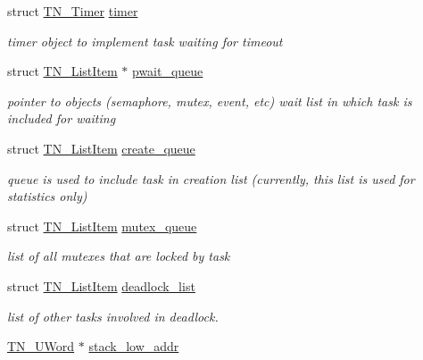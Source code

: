 \begin{DoxyCompactItemize}
struct \hyperlink{structTN__Timer}{T\+N\+\_\+\+Timer} \hyperlink{structTN__Task_ac394d7ba177bab077969e9d96cddd8fb}{timer}
\begin{DoxyCompactList}\small\item\em timer object to implement task waiting for timeout \end{DoxyCompactList}\item 
\mbox{\label{structTN__Task_a971ab5689af53bed2548c62f3bcabdc5}} 
struct \hyperlink{structTN__ListItem}{T\+N\+\_\+\+List\+Item} $\ast$ \hyperlink{structTN__Task_a971ab5689af53bed2548c62f3bcabdc5}{pwait\+\_\+queue}
\begin{DoxyCompactList}\small\item\em pointer to object\textquotesingle{}s (semaphore, mutex, event, etc) wait list in which task is included for waiting \end{DoxyCompactList}\item 
\mbox{\label{structTN__Task_aedb23df723d259530f10a122fec42334}} 
struct \hyperlink{structTN__ListItem}{T\+N\+\_\+\+List\+Item} \hyperlink{structTN__Task_aedb23df723d259530f10a122fec42334}{create\+\_\+queue}
\begin{DoxyCompactList}\small\item\em queue is used to include task in creation list (currently, this list is used for statistics only) \end{DoxyCompactList}\item 
\mbox{\label{structTN__Task_ad4decd7355c95a5b60a6774c3ee19eb9}} 
struct \hyperlink{structTN__ListItem}{T\+N\+\_\+\+List\+Item} \hyperlink{structTN__Task_ad4decd7355c95a5b60a6774c3ee19eb9}{mutex\+\_\+queue}
\begin{DoxyCompactList}\small\item\em list of all mutexes that are locked by task \end{DoxyCompactList}\item 
struct \hyperlink{structTN__ListItem}{T\+N\+\_\+\+List\+Item} \hyperlink{structTN__Task_a097e79851e01fb3c73f0346d99ea8b7e}{deadlock\+\_\+list}
\begin{DoxyCompactList}\small\item\em list of other tasks involved in deadlock. \end{DoxyCompactList}\item 
\hyperlink{tn__arch__example_8h_ab80cba0fe9ffcd9011d53dfeb9e39bf4}{T\+N\+\_\+\+U\+Word} $\ast$ \hyperlink{structTN__Task_a05cfde00b0cd82cda88a6698dc159e31}{stack\+\_\+low\+\_\+addr}

\end{DoxyCompactItemize}
